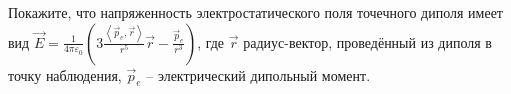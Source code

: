 \documentclass[__main__.tex]{subfiles}
\begin{document}
Покажите, что напряженность электростатического поля точечного диполя имеет вид $\vec{E} = \frac{1}{4\pi\varepsilon_0}\left( 3\frac{\left<\vec{p}_e, \vec{r}\right>}{r^5}\vec{r} - \frac{\vec{p}_e}{r^3}\right)$, где $\vec{r}$ радиус-вектор, проведённый из диполя в точку наблюдения, $\vec{p}_{e}$ -- электрический дипольный момент.\\ 

\end{document}
